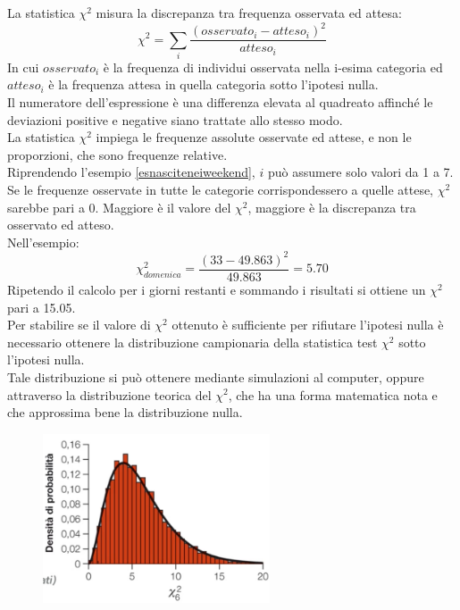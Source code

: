 \documentclass[10pt, draft]{book}
\begin{document}
La statistica $\chi^2$ misura la discrepanza tra frequenza osservata ed attesa:
\begin{equation}
\chi^2 = \sum_i \frac{(osservato_i - atteso_i)^2}{atteso_i}
\end{equation}
In cui $osservato_i$ è la frequenza di individui osservata nella i-esima categoria ed $atteso_i$ è la frequenza attesa in quella categoria sotto l'ipotesi nulla.
\\
Il numeratore dell'espressione è una differenza elevata al quadreato affinché le deviazioni positive e negative siano trattate allo stesso modo.
\\
La statistica $\chi^2$ impiega le frequenze assolute osservate ed attese, e non le proporzioni, che sono frequenze relative.
\\
Riprendendo l'esempio \ref{esnasciteneiweekend}, $i$ può assumere solo valori da 1 a 7. Se le frequenze osservate in tutte le categorie corrispondessero a quelle attese, $\chi^2$ sarebbe pari a 0. Maggiore è il valore del $\chi^2$, maggiore è la discrepanza tra osservato ed atteso.
\\
Nell'esempio:
\begin{equation}
\chi^2_{domenica} = \frac{(33 - 49.863)^2}{49.863} = 5.70
\end{equation}
Ripetendo il calcolo per i giorni restanti e sommando i risultati si ottiene un $\chi^2$ pari a 15.05.
\\
Per stabilire se il valore di $\chi^2$ ottenuto è sufficiente per rifiutare l'ipotesi nulla è necessario ottenere la distribuzione campionaria della statistica test $\chi^2$ sotto l'ipotesi nulla.
\\
Tale distribuzione si può ottenere mediante simulazioni al computer, oppure attraverso la distribuzione teorica del $\chi^2$, che ha una forma matematica nota e che approssima bene la distribuzione nulla.
\clearpage
    \begin{figure}[h]\label{fig8.2-1}
    \centering
    \includegraphics[width=0.6\textwidth]{fig8.2-1}
    \caption{\small{}}
    \end{figure}
\end{document}
